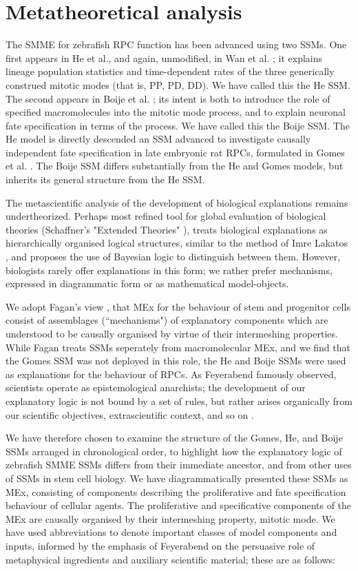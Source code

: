 \section{Metatheoretical analysis}

The SMME for zebrafish RPC function has been advanced using two SSMs. One first appears in He et al., and again, unmodified, in Wan et al. \cite{He2012,Wan2016}; it explains lineage population statistics and time-dependent rates of the three generically construed mitotic modes (that is, PP, PD, DD). We have called this the He SSM. The second appears in Boije et al. \cite{Boije2015}; its intent is both to introduce the role of specified macromolecules into the mitotic mode process, and to explain neuronal fate specification in terms of the process. We have called this the Boije SSM. The He model is directly descended an SSM advanced to investigate causally independent fate specification in late embryonic rat RPCs, formulated in Gomes et al. \cite{Gomes2011}. The Boije SSM differs substantially from the He and Gomes models, but inherits its general structure from the He SSM.

The metascientific analysis of the development of biological explanations remains undertheorized. Perhaps most refined tool for global evaluation of biological theories (Schaffner's "Extended Theories" \cite{Schaffner1993}), treats biological explanations as hierarchically organised logical structures, similar to the method of Imre Lakatos \cite{Lakatos1976}, and proposes the use of Bayesian logic to distinguish between them. However, biologists rarely offer explanations in this form; we rather prefer mechanisms, expressed in diagrammatic form or as mathematical model-objects.

We adopt Fagan's view \cite{Fagan2015}, that MEx for the behaviour of stem and progenitor cells consist of assemblages (``mechanisms") of explanatory components which are understood to be causally organised by virtue of their intermeshing properties. While Fagan treats SSMs seperately from macromolecular MEx, and we find that the Gomes SSM was not deployed in this role, the He and Boije SSMs were used as explanations for the behaviour of RPCs. As Feyerabend famously observed, scientists operate as epistemological anarchists; the development of our explanatory logic is not bound by a set of rules, but rather arises organically from our scientific objectives, extrascientific context, and so on \cite{Feyerabend1993}.
 
We have therefore chosen to examine the structure of the Gomes, He, and Boije SSMs arranged in chronological order, to highlight how the explanatory logic of zebrafish SMME SSMs differs from their immediate ancestor, and from other uses of SSMs in stem cell biology. We have diagrammatically presented these SSMs as MEx, consisting of components describing the proliferative and fate specification behaviour of cellular agents. The proliferative and specificative components of the MEx are causally organised by their intermeshing property, mitotic mode. We have used abbreviations to denote important classes of model components and inputs, informed by the emphasis of Feyerabend on the persuasive role of metaphysical ingredients and auxiliary scientific material; these are as follows:

